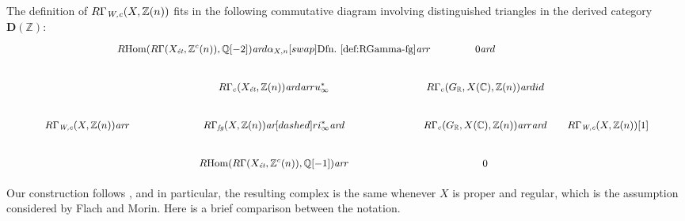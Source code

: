 \documentclass[leqno,12pt]{article}
\theoremstyle{plain}
\theoremstyle{definition}
\DeclareMathOperator{\Hom}{Hom}
\newcommand{\CC}{\mathbb{C}}
\newcommand{\QQ}{\mathbb{Q}}
\newcommand{\RR}{\mathbb{R}}
\newcommand{\ZZ}{\mathbb{Z}}
\newcommand{\Wc}{\text{\it W,c}}
\newcommand{\ar}{\text{\it ar}}
\newcommand{\et}{\text{\it \'{e}t}}
\newcommand{\fg}{\text{\it fg}}
\newcommand{\RHom}{R\!\Hom}
\newcommand{\DZ}{{\mathbf{D} (\ZZ)}}
\begin{document}
The definition of $R\Gamma_\Wc (X,\ZZ(n))$ fits in the following commutative
diagram involving distinguished triangles in the derived category $\DZ$:
\begin{equation}
  \label{eqn:diagram-defining-everything}
  \begin{tikzcd}[column sep=1em,font=\small]
    &[-3em] \RHom (R\Gamma (X_\et, \ZZ^c (n)), \QQ [-2]) \ar{d}{\alpha_{X,n}}[swap]{\text{Dfn.~\ref{def:RGamma-fg}}} \ar{r} &[-2.5em] 0 \ar{d} \\
    & R\Gamma_c (X_\et, \ZZ(n)) \ar{d}\ar{r}{u_\infty^*} & R\Gamma_c (G_\RR, X (\CC), \ZZ(n))\ar{d}{id} \\
    R\Gamma_\Wc (X, \ZZ (n)) \ar{r} & R\Gamma_\fg (X, \ZZ(n)) \ar[dashed]{r}{i_\infty^*}\ar{d} & R\Gamma_c (G_\RR, X (\CC), \ZZ(n)) \ar{r} \ar{d} & R\Gamma_\Wc (X, \ZZ (n)) [1] \\
    & \RHom (R\Gamma (X_\et, \ZZ^c (n)), \QQ [-1]) \ar{r} & 0
  \end{tikzcd}
\end{equation}

Our construction follows \cite{Flach-Morin-2018}, and in particular,
the resulting complex is the same whenever $X$ is proper and regular, which is
the assumption considered by Flach and Morin. Here is a brief comparison between
the notation.
\end{document}
